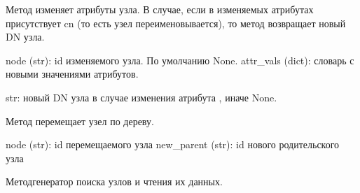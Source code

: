 \documentclass[a4paper,10pt,russian]{sphinxmanual}
\begin{document}
\begin{fulllineitems}
\begin{fulllineitems}
\end{fulllineitems}



\begin{fulllineitems}

\pysigstartsignatures
{}
\pysigstopsignatures
\sphinxAtStartPar
Метод изменяет атрибуты узла.
В случае, если в изменяемых атрибутах присутствует cn (то есть узел
переименовывается), то метод возвращает новый DN узла.
\begin{description}
\sphinxAtStartPar
node (str): id изменяемого узла. По умолчанию \sphinxhyphen{} None.
attr\_vals (dict): словарь с новыми значениями атрибутов.

\sphinxAtStartPar
str: новый DN узла в случае изменения атрибута , иначе \sphinxhyphen{} None.

\end{description}

\end{fulllineitems}



\begin{fulllineitems}

\pysigstartsignatures
{}
\pysigstopsignatures
\sphinxAtStartPar
Метод перемещает узел по дереву.
\begin{description}
\sphinxAtStartPar
node (str): id перемещаемого узла
new\_parent (str): id нового родительского узла

\end{description}

\end{fulllineitems}



\begin{fulllineitems}

\pysigstartsignatures
{}
\pysigstopsignatures
\sphinxAtStartPar
Метод\sphinxhyphen{}генератор поиска узлов и чтения их данных.


\end{fulllineitems}
\end{fulllineitems}
\end{document}
